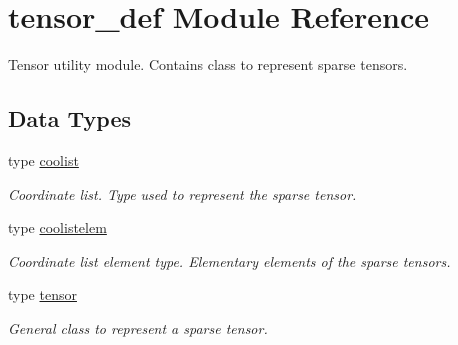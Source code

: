 \hypertarget{namespacetensor__def}{}\section{tensor\+\_\+def Module Reference}
\label{namespacetensor__def}


Tensor utility module. Contains class to represent sparse tensors.  


\subsection*{Data Types}
\begin{DoxyCompactItemize}
\item 
type \hyperlink{structtensor__def_1_1coolist}{coolist}
\begin{DoxyCompactList}\small\item\em Coordinate list. Type used to represent the sparse tensor. \end{DoxyCompactList}\item 
type \hyperlink{structtensor__def_1_1coolistelem}{coolistelem}
\begin{DoxyCompactList}\small\item\em Coordinate list element type. Elementary elements of the sparse tensors. \end{DoxyCompactList}\item 
type \hyperlink{structtensor__def_1_1tensor}{tensor}
\begin{DoxyCompactList}\small\item\em General class to represent a sparse tensor. \end{DoxyCompactList}\end{DoxyCompactItemize}
